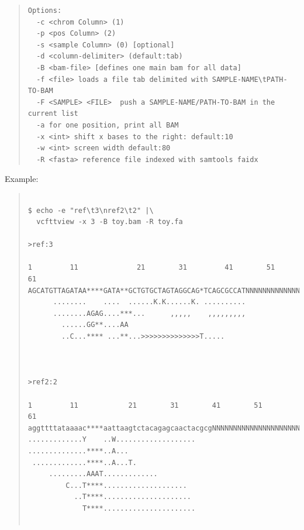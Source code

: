 \documentclass[12pt]{article}
\begin{document}
\begin{quote}
\begin{verbatim}
Options:
  -c <chrom Column> (1)
  -p <pos Column> (2)
  -s <sample Column> (0) [optional]
  -d <column-delimiter> (default:tab)
  -B <bam-file> [defines one main bam for all data]
  -f <file> loads a file tab delimited with SAMPLE-NAME\tPATH-TO-BAM
  -F <SAMPLE> <FILE>  push a SAMPLE-NAME/PATH-TO-BAM in the current list
  -a for one position, print all BAM
  -x <int> shift x bases to the right: default:10
  -w <int> screen width default:80
  -R <fasta> reference file indexed with samtools faidx 
\end{verbatim}
\end{quote}
Example:
\begin{quote}
\begin{verbatim}

$ echo -e "ref\t3\nref2\t2" |\
  vcfttview -x 3 -B toy.bam -R toy.fa

>ref:3

1         11              21        31         41        51        61           
AGCATGTTAGATAA****GATA**GCTGTGCTAGTAGGCAG*TCAGCGCCATNNNNNNNNNNNNNNNNNNNNNNNNNNNN
      ........    ....  ......K.K......K. ..........                            
      ........AGAG....***...      ,,,,,    ,,,,,,,,,                            
        ......GG**....AA                                                        
        ..C...**** ...**...>>>>>>>>>>>>>>T.....                                 



>ref2:2

1         11            21        31        41        51        61              
aggttttataaaac****aattaagtctacagagcaactacgcgNNNNNNNNNNNNNNNNNNNNNNNNNNNNNNNNNNNN
.............Y    ..W...................                                        
..............****..A...                                                        
 .............****..A...T.                                                      
     .........AAAT.............                                                 
         C...T****....................                                          
           ..T****.....................                                         
             T****......................                                        
                                                               
\end{verbatim}
\end{quote}
\end{document}
